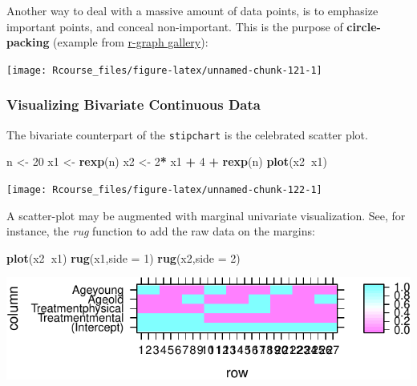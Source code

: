 \documentclass[]{book}
\newenvironment{Shaded}{\begin{snugshade}}{\end{snugshade}}
\newcommand{\KeywordTok}[1]{\textcolor[rgb]{0.13,0.29,0.53}{\textbf{#1}}}
\newcommand{\DataTypeTok}[1]{\textcolor[rgb]{0.13,0.29,0.53}{#1}}
\newcommand{\DecValTok}[1]{\textcolor[rgb]{0.00,0.00,0.81}{#1}}
\newcommand{\StringTok}[1]{\textcolor[rgb]{0.31,0.60,0.02}{#1}}
\newcommand{\OperatorTok}[1]{\textcolor[rgb]{0.81,0.36,0.00}{\textbf{#1}}}
\newcommand{\NormalTok}[1]{#1}
\theoremstyle{definition}
\theoremstyle{definition}
\theoremstyle{definition}
\theoremstyle{remark}
\begin{document}
Another way to deal with a massive amount of data points, is to
emphasize important points, and conceal non-important. This is the
purpose of \textbf{circle-packing} (example from
\href{https://www.r-graph-gallery.com/308-interactive-circle-packing/}{r-graph
gallery}):

\texttt{[image: Rcourse\_files/figure-latex/unnamed-chunk-121-1]}

\subsubsection{Visualizing Bivariate Continuous
Data}\label{visualizing-bivariate-continuous-data}

The bivariate counterpart of the \texttt{stipchart} is the celebrated
scatter plot.

\begin{Shaded}
\begin{Highlighting}[]
\NormalTok{n <-}\StringTok{ }\DecValTok{20}
\NormalTok{x1 <-}\StringTok{ }\KeywordTok{rexp}\NormalTok{(n)}
\NormalTok{x2 <-}\StringTok{ }\DecValTok{2}\OperatorTok{*}\StringTok{ }\NormalTok{x1 }\OperatorTok{+}\StringTok{ }\DecValTok{4} \OperatorTok{+}\StringTok{ }\KeywordTok{rexp}\NormalTok{(n)}
\KeywordTok{plot}\NormalTok{(x2}\OperatorTok{~}\NormalTok{x1)}
\end{Highlighting}
\end{Shaded}

\texttt{[image: Rcourse\_files/figure-latex/unnamed-chunk-122-1]}

A scatter-plot may be augmented with marginal univariate visualization.
See, for instance, the \emph{rug} function to add the raw data on the
margins:

\begin{Shaded}
\begin{Highlighting}[]
\KeywordTok{plot}\NormalTok{(x2}\OperatorTok{~}\NormalTok{x1)}
\KeywordTok{rug}\NormalTok{(x1,}\DataTypeTok{side =} \DecValTok{1}\NormalTok{)}
\KeywordTok{rug}\NormalTok{(x2,}\DataTypeTok{side =} \DecValTok{2}\NormalTok{)}
\end{Highlighting}
\end{Shaded}

\includegraphics[width=0.5\linewidth]{Rcourse_files/figure-latex/unnamed-chunk-123-1}
\end{document}
